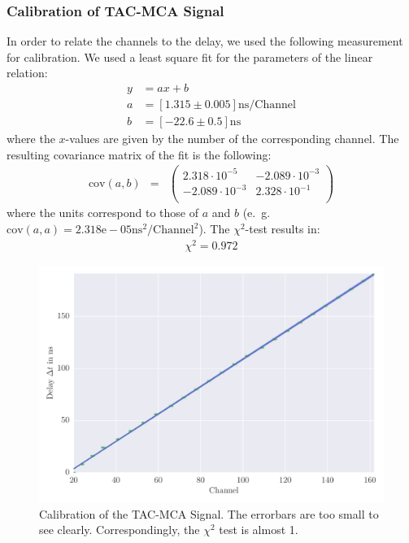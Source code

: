 \subsubsection{Calibration of TAC-MCA Signal}
\label{subs:calib_TAC}
In order to relate the channels to the delay, we used the following
measurement for calibration. We used a least square fit for the parameters
of the linear relation:
\begin{align}
    \label{eq:coeff}
    y &= ax + b \\
    a &= \left[ 1.315 \pm 0.005 \right] \mathrm{ns} / \mathrm{Channel}\\
    b &= \left[ -22.6 \pm 0.5 \right]\mathrm{ns} 
\end{align}
where the $x$-values are given by the number of the corresponding channel. 
The resulting covariance matrix of the fit is the following:
\begin{align}
    \label{eq:cov}
    \mathrm{cov}(a, b) &=& 
    \begin{pmatrix}
        2.318 \cdot 10^{-5} &-2.089\cdot 10^{-3}\\
        -2.089\cdot 10^{-3}&2.328\cdot 10^{-1}\\
    \end{pmatrix}
\end{align}
where the units correspond to those of $a$ and $b$ 
(e.~g. $\mathrm{cov}(a,a) = 2.318\mathrm{e}-05 \mathrm{ns^2} / \mathrm{Channel}^2$).
The $\chi^2$-test results in:
\begin{align}
    \label{eq:}
   \chi^2 = 0.972
\end{align}

\label{sub:calibration_of_tac_mca_signal}
\begin{figure}[htpb]
    \centering
    \includegraphics[width=1.0\linewidth]{analysis/figures/plot7}
    \caption{
        Calibration of the TAC-MCA Signal. The errorbars are too small
        to see clearly. Correspondingly, the $\chi^2$ test is almost 1.}
    \label{fig:plot7}
\end{figure}



